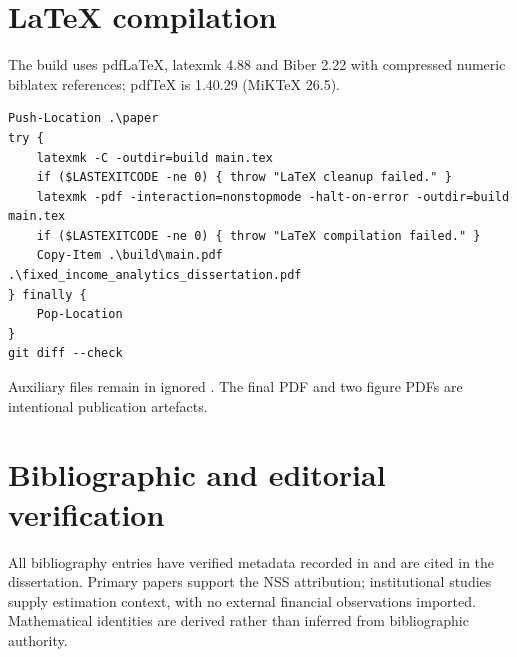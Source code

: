 \section{LaTeX compilation}
The build uses pdfLaTeX, latexmk 4.88 and Biber 2.22 with compressed numeric biblatex references; pdfTeX is 1.40.29 (MiKTeX 26.5).
\begingroup\footnotesize
\begin{verbatim}
Push-Location .\paper
try {
    latexmk -C -outdir=build main.tex
    if ($LASTEXITCODE -ne 0) { throw "LaTeX cleanup failed." }
    latexmk -pdf -interaction=nonstopmode -halt-on-error -outdir=build main.tex
    if ($LASTEXITCODE -ne 0) { throw "LaTeX compilation failed." }
    Copy-Item .\build\main.pdf .\fixed_income_analytics_dissertation.pdf
} finally {
    Pop-Location
}
git diff --check
\end{verbatim}
\endgroup
Auxiliary files remain in ignored . The final PDF and two figure PDFs are intentional publication artefacts.

\section{Bibliographic and editorial verification}
All bibliography entries have verified metadata recorded in  and are cited in the dissertation. Primary papers support the NSS attribution; institutional studies supply estimation context, with no external financial observations imported. Mathematical identities are derived rather than inferred from bibliographic authority.
